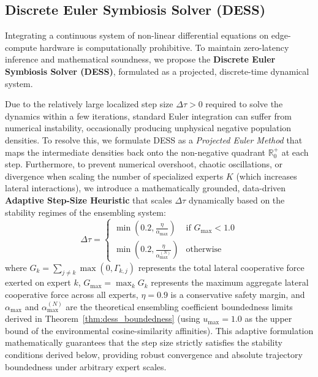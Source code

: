 \subsection{Discrete Euler Symbiosis Solver (DESS)}
Integrating a continuous system of non-linear differential equations on edge-compute hardware is computationally prohibitive. To maintain zero-latency inference and mathematical soundness, we propose the \textbf{Discrete Euler Symbiosis Solver (DESS)}, formulated as a projected, discrete-time dynamical system.

Due to the relatively large localized step size $\Delta \tau > 0$ required to solve the dynamics within a few iterations, standard Euler integration can suffer from numerical instability, occasionally producing unphysical negative population densities. To resolve this, we formulate DESS as a \emph{Projected Euler Method} that maps the intermediate densities back onto the non-negative quadrant $\mathbb{R}^+_{0}$ at each step. Furthermore, to prevent numerical overshoot, chaotic oscillations, or divergence when scaling the number of specialized experts $K$ (which increases lateral interactions), we introduce a mathematically grounded, data-driven \textbf{Adaptive Step-Size Heuristic} that scales $\Delta \tau$ dynamically based on the stability regimes of the ensembling system:
\begin{equation}
    \Delta \tau = 
    \begin{cases}
        \min\left(0.2, \frac{\eta}{\alpha_{\max}}\right) & \text{if } G_{\max} < 1.0 \\
        \min\left(0.2, \frac{\eta}{\alpha_{\max}^{(N)}}\right) & \text{otherwise}
    \end{cases}
\end{equation}
where $G_k = \sum_{j \neq k} \max(0, \Gamma_{k, j})$ represents the total lateral cooperative force exerted on expert $k$, $G_{\max} = \max_k G_k$ represents the maximum aggregate lateral cooperative force across all experts, $\eta = 0.9$ is a conservative safety margin, and $\alpha_{\max}$ and $\alpha_{\max}^{(N)}$ are the theoretical ensembling coefficient boundedness limits derived in Theorem~\ref{thm:dess_boundedness} (using $u_{\max} = 1.0$ as the upper bound of the environmental cosine-similarity affinities). This adaptive formulation mathematically guarantees that the step size strictly satisfies the stability conditions derived below, providing robust convergence and absolute trajectory boundedness under arbitrary expert scales.

